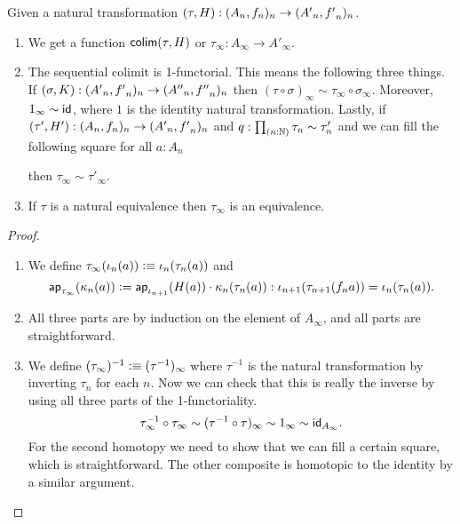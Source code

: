 \begin{lem}\label{lem:seq_colim_functor}
  Given a natural transformation $(\tau,H):\sequence{A}{f}\to\sequence{A'}{f'}$.
  \begin{enumerate}
    \item\label{part:seq_colim_functor} We get a function $\tfcolim(\tau,H)$ or $\tau_\infty:A_\infty\to A'_\infty$.
    \item\label{part:1_functoriality} The sequential colimit is 1-functorial. This means the following three things. If $(\sigma,K):\sequence{A'}{f'}\to\sequence{A''}{f''}$ then $(\tau\circ\sigma)_\infty\sim\tau_\infty\circ\sigma_\infty$. Moreover, $1_\infty\sim \idfunc$, where $1$ is the identity natural transformation. Lastly, if $(\tau',H'):\sequence{A}{f}\to\sequence{A'}{f'}$ and $q:\prd{n:\N}\tau_n\sim\tau'_n$ and we can fill the following square for all $a:A_n$
    \begin{center}\end{center}
    then $\tau_\infty\sim\tau'_\infty$.
    \item\label{part:functor_equivalence} If $\tau$ is a natural equivalence then $\tau_\infty$ is an equivalence.
  \end{enumerate}
\end{lem}
\begin{proof}\mbox{}
  \begin{enumerate}
    \item 
    We define $\tau_\infty(\iota_n(a))\defeq\iota_n(\tau_n(a))$ and 
    $$\apfunc{\tau_\infty}(\kappa_n(a))\vcentcolon=\apfunc{\iota_{n+1}}(H(a))\cdot\kappa_n(\tau_n(a)):
    \iota_{n+1}(\tau_{n+1}(f_na))=\iota_n(\tau_n(a)).$$
    \item All three parts are by induction on the element of $A_\infty$, and all parts are straightforward.
    \item We define $(\tau_\infty)^{-1}\defeq(\tau^{-1})_\infty$ where $\tau^{-1}$ is the natural transformation by inverting $\tau_n$ for each $n$. Now we can check that this is really the inverse by using all three parts of the 1-functoriality.
    $$\tau_\infty^{-1}\circ\tau_\infty\sim (\tau^{-1}\circ\tau)_\infty\sim 1_\infty\sim\idfunc[A_\infty].$$
    For the second homotopy we need to show that we can fill a certain square, which is straightforward.
    The other composite is homotopic to the identity by a similar argument.\qedhere
  \end{enumerate}
\end{proof}

